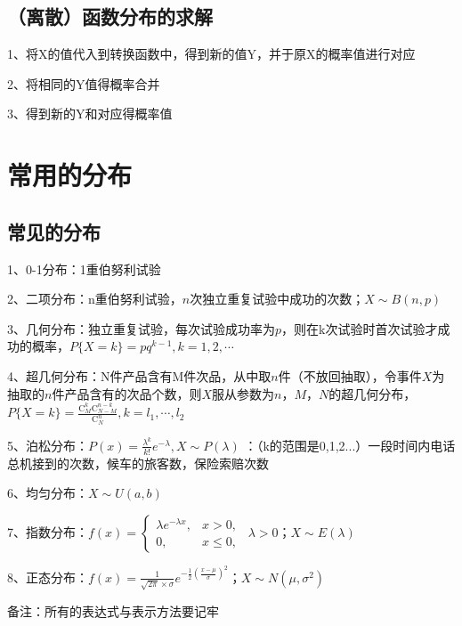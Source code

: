 \subsection{（离散）函数分布的求解}

1、将X的值代入到转换函数中，得到新的值Y，并于原X的概率值进行对应

2、将相同的Y值得概率合并

3、得到新的Y和对应得概率值

\section{常用的分布}



\subsection{常见的分布}

1、0-1分布：1重伯努利试验

2、二项分布：n重伯努利试验，$ n $次独立重复试验中成功的次数；$ X \sim B(n,p) $

3、几何分布：独立重复试验，每次试验成功率为$ p $，则在k次试验时首次试验才成功的概率，$ P\{X=k\}=p q^{k-1}, k=1,2, \cdots $

4、超几何分布：N件产品含有M件次品，从中取$ n $件（不放回抽取），令事件$ X $为抽取的$ n $件产品含有的次品个数，则$ X $服从参数为$ n $，$ M $，$ N $的超几何分布，$ P\{X=k\}=\frac{\mathrm{C}_{M}^{k} \mathrm{C}_{N-M}^{n-k}}{\mathrm{C}_{N}^{n}}, k=l_{1}, \cdots, l_{2} $

5、泊松分布：$ P(x) = \frac{\lambda^k}{k!}e^{-\lambda},X \sim P(\lambda) $ ：（k的范围是0,1,2...）一段时间内电话总机接到的次数，候车的旅客数，保险索赔次数

6、均匀分布：$ X \sim U(a,b) $

7、指数分布：$ f(x) = \begin{cases} \lambda e^{-\lambda x}, & x > 0, \\[5ex] 0, & x \le 0, \end{cases} \ \ \lambda >0 $；$ X \sim E(\lambda) $

8、正态分布：$ f(x)=\frac{1}{\sqrt{{2\pi}}\times\sigma}e^{-\frac{1}{2}(\frac{x-\mu}{\sigma})^2} $；$ X \sim N(\mu,\sigma^2) $



备注：所有的表达式与表示方法要记牢



